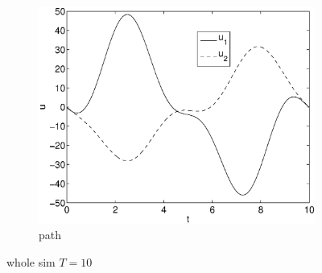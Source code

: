 \begin{figure}[h]
\begin{subfigure}[b]{\textwidth}
\centering
\includegraphics[height=0.3\textheight]{img/final_15_15_10_u.eps}
\caption{path}
\end{subfigure}
\caption{whole sim $T=10$}
\end{figure}

